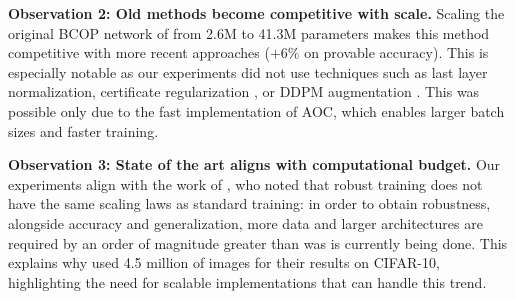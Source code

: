 \noindent\textbf{Observation 2: Old methods become competitive with scale.} Scaling the original BCOP network of \cite{li_preventing_2019} from 2.6M to 41.3M parameters makes this method competitive with more recent approaches ($+6\%$ on provable accuracy). This is especially notable as our experiments did not use techniques such as last layer normalization\cite{singla_improved_2022}, certificate regularization \cite{singla_skew_2021}, or DDPM augmentation \cite{hu_recipe_2023}.
This was possible only due to the fast implementation of AOC, which enables larger batch sizes and faster training.

\noindent\textbf{Observation 3: State of the art aligns with computational budget.} Our experiments align with the work of \cite{prach2024intriguing, bubeck2021universal}, who noted that robust training does not have the same scaling laws as standard training: in order to obtain robustness, alongside accuracy and generalization, more data and larger architectures are required by an order of magnitude greater than was is currently being done. This explains why \cite{hu_recipe_2023} used 4.5 million of images for their results on CIFAR-10, highlighting the need for scalable implementations that can handle this trend. 





